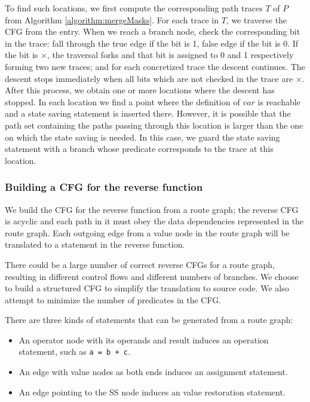 To find such locations, we first compute the corresponding path traces $T$ of $P$ from Algorithm \ref{algorithm:mergeMasks}. 
For each trace in $T$, we traverse the CFG from the entry. 
When we reach a branch node, check the corresponding bit in the trace: fall through the true edge if the bit is 1, false edge if the bit is 0. 
If the bit is $\times$, the traversal forks and that bit is assigned to 0 and 1 respectively forming two new traces; and for each concretized trace the descent continues. 
The descent stops immediately when all bits which are not checked in the trace are $\times$. 
After this process, we obtain one or more locations where the descent has stopped. 
In each location we find a point where the definition of $var$ is reachable and a state saving statement is inserted there. 
However, it is possible that the path set containing the paths passing through this location is larger than the one on which the state saving is needed. 
In this case, we guard the state saving statement with a branch whose predicate corresponds to the trace at this location.



\subsubsection{Building a CFG for the reverse function}
We build the CFG for the reverse function from a route graph; the reverse CFG is acyclic and each path in it must obey the data dependencies represented in the route graph.
Each outgoing edge from a value node in the route graph will be translated to a statement in the reverse function. 

There could be a large number of correct reverse CFGs for a route graph, resulting in different control flows and different numbers of branches. 
We choose to build a structured CFG to simplify the translation to source code. 
We also attempt to minimize the number of predicates in the CFG. 

There are three kinds of statements that can be generated from a route graph:
\begin{itemize}
	\item An operator node with its operands and result induces an operation statement,  such as \texttt{a = b + c}.
	\item An edge with value nodes as both ends induces an assignment statement.
	\item An edge pointing to the SS node induces an value restoration statement.
\end{itemize}


